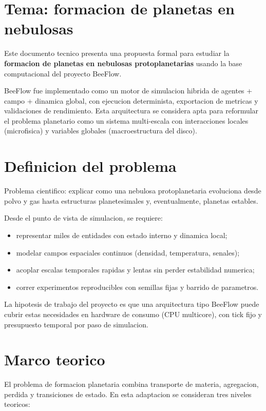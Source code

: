 \documentclass[11pt]{article}
\begin{document}
\section*{Tema: formacion de planetas en nebulosas}

Este documento tecnico presenta una propuesta formal para estudiar la \textbf{formacion de planetas en nebulosas protoplanetarias} usando la base computacional del proyecto BeeFlow.

BeeFlow fue implementado como un motor de simulacion hibrida de agentes + campo + dinamica global, con ejecucion determinista, exportacion de metricas y validaciones de rendimiento. Esta arquitectura se considera apta para reformular el problema planetario como un sistema multi-escala con interacciones locales (microfisica) y variables globales (macroestructura del disco).

\section*{Definicion del problema}

Problema cientifico: explicar como una nebulosa protoplanetaria evoluciona desde polvo y gas hasta estructuras planetesimales y, eventualmente, planetas estables.

Desde el punto de vista de simulacion, se requiere:

\begin{itemize}
  \item representar miles de entidades con estado interno y dinamica local;
  \item modelar campos espaciales continuos (densidad, temperatura, senales);
  \item acoplar escalas temporales rapidas y lentas sin perder estabilidad numerica;
  \item correr experimentos reproducibles con semillas fijas y barrido de parametros.
\end{itemize}

La hipotesis de trabajo del proyecto es que una arquitectura tipo BeeFlow puede cubrir estas necesidades en hardware de consumo (CPU multicore), con tick fijo y presupuesto temporal por paso de simulacion.

\section*{Marco teorico}

El problema de formacion planetaria combina transporte de materia, agregacion, perdida y transiciones de estado. En esta adaptacion se consideran tres niveles teoricos:
\end{document}

